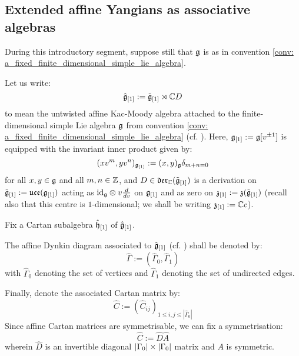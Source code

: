        \subsection{Extended affine Yangians as associative algebras}
            During this introductory segment, suppose still that $\mathfrak{g}$ is as in convention \ref{conv: a_fixed_finite_dimensional_simple_lie_algebra}.
            \begin{convention} \label{conv: a_fixed_untwisted_affine_kac_moody_algebra}
                Let us write:
                    $$\hat{\mathfrak{g}}_{[1]} := \tilde{\mathfrak{g}}_{[1]} \rtimes \mathbb{C} D$$
                to mean the untwisted affine Kac-Moody algebra attached to the finite-dimensional simple Lie algebra $\mathfrak{g}$ from convention \ref{conv: a_fixed_finite_dimensional_simple_lie_algebra} (cf. \cite[Chapter 7]{kac_infinite_dimensional_lie_algebras}). Here, $\mathfrak{g}_{[1]} := \mathfrak{g}[v^{\pm 1}]$ is equipped with the invariant inner product given by:
                    $$(x v^m, y v^n)_{\mathfrak{g}_{[1]}} := (x, y)_{\mathfrak{g}} \delta_{m + n = 0}$$
                for all $x, y \in \mathfrak{g}$ and all $m, n \in \mathbb{Z}$, and $D \in \mathfrak{der}_{\mathbb{C}}(\tilde{\mathfrak{g}}_{[1]})$ is a derivation on $\tilde{\mathfrak{g}}_{[1]} := \mathfrak{uce}(\mathfrak{g}_{[1]})$ acting as $\id_{\g} \tensor v \frac{d}{dv}$ on $\mathfrak{g}_{[1]}$ and as zero on $\mathfrak{z}_{[1]} := \mathfrak{z}(\tilde{\mathfrak{g}}_{[1]})$ (recall also that this centre is $1$-dimensional; we shall be writing $\mathfrak{z}_{[1]} := \mathbb{C} c$).
    
                Fix a Cartan subalgebra $\hat{\mathfrak{h}}_{[1]}$ of $\hat{\mathfrak{g}}_{[1]}$.
    
                The affine Dynkin diagram associated to $\hat{\mathfrak{g}}_{[1]}$ (cf. \cite[Chapter 4]{kac_infinite_dimensional_lie_algebras}) shall be denoted by:
                    $$\hat{\Gamma} := ( \hat{\Gamma}_0, \hat{\Gamma}_1 )$$
                with $\hat{\Gamma}_0$ denoting the set of vertices and $\hat{\Gamma}_1$ denoting the set of undirected edges.
    
                Finally, denote the associated Cartan matrix by:
                    $$\hat{C} := (\hat{C}_{ij})_{1 \leq i, j \leq |\hat{\Gamma}_0|}$$
                Since affine Cartan matrices are symmetrisable, we can fix a symmetrisation:
                    $$\hat{C} := \hat{D} \hat{A}$$
                wherein $\hat{D}$ is an invertible diagonal $|\Gamma_0| \x |\Gamma_0|$ matrix and $A$ is symmetric. 
            \end{convention}
        
